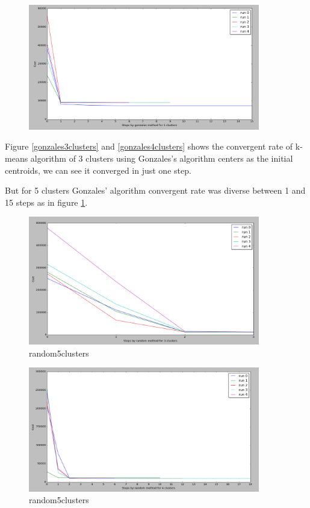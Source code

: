 \begin{figure}[!htb]
\centering
\includegraphics[width=0.9\textwidth]{shots/gonzales5clusters.png}
\caption{ }
\label{gonzales5clusters}
\end{figure}

Figure \ref{gonzales3clusters} and \ref{gonzales4clusters} shows the convergent rate of k-means algorithm of 3 clusters using Gonzales's algorithm centers as the initial centroids, we can see it converged in just one step.

But for 5 clusters Gonzales' algorithm convergent rate was diverse between 1 and 15 steps as in figure \ref{gonzales5clusters}.

\begin{figure}[!htb]
\centering
\includegraphics[width=0.9\textwidth]{shots/random3clusters.png}
\caption{ random5clusters}
\label{random3clusters}
\end{figure}



\begin{figure}[!htb]
\centering
\includegraphics[width=0.9\textwidth]{shots/random4clusters.png}
\caption{ random5clusters}
\label{random4clusters}
\end{figure}




